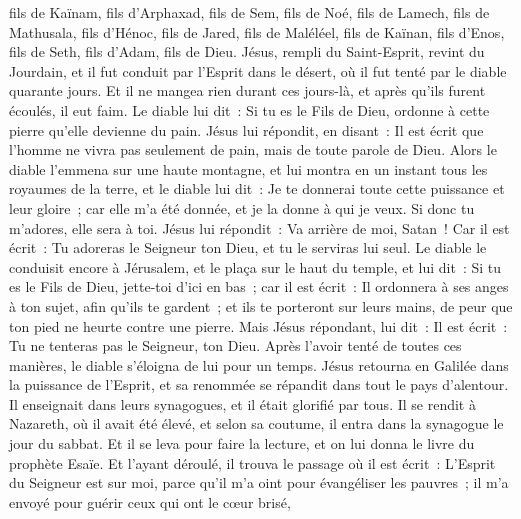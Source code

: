 \begin{multicols}{2}
fils de Kaïnam, fils d'Arphaxad, fils de Sem, fils de Noé, fils de Lamech,
fils de Mathusala, fils d'Hénoc, fils de Jared, fils de Maléléel, fils de Kaïnan,
fils d'Enos, fils de Seth, fils d'Adam, fils de Dieu.
\VerseOne{}Jésus, rempli du Saint-Esprit, revint du Jourdain, et il fut conduit par l'Esprit dans le désert,
où il fut tenté par le diable quarante jours. Et il ne mangea rien durant ces jours-là, et après qu'ils furent écoulés, il eut faim.
Le diable lui dit~: Si tu es le Fils de Dieu, ordonne à cette pierre qu'elle devienne du pain.
Jésus lui répondit, en disant~: Il est écrit que l'homme ne vivra pas seulement de pain, mais de toute parole de Dieu.
Alors le diable l'emmena sur une haute montagne, et lui montra en un instant tous les royaumes de la terre,
et le diable lui dit~: Je te donnerai toute cette puissance et leur gloire~; car elle m'a été donnée, et je la donne à qui je veux.
Si donc tu m'adores, elle sera à toi.
Jésus lui répondit~: Va arrière de moi, Satan~! Car il est écrit~: Tu adoreras le Seigneur ton Dieu, et tu le serviras lui seul.
Le diable le conduisit encore à Jérusalem, et le plaça sur le haut du temple, et lui dit~: Si tu es le Fils de Dieu, jette-toi d'ici en bas~;
car il est écrit~: Il ordonnera à ses anges à ton sujet, afin qu'ils te gardent~;
et ils te porteront sur leurs mains, de peur que ton pied ne heurte contre une pierre.
Mais Jésus répondant, lui dit~: Il est écrit~: Tu ne tenteras pas le Seigneur, ton Dieu.
Après l'avoir tenté de toutes ces manières, le diable s'éloigna de lui pour un temps.
Jésus retourna en Galilée dans la puissance de l'Esprit, et sa renommée se répandit dans tout le pays d'alentour.
Il enseignait dans leurs synagogues, et il était glorifié par tous.
Il se rendit à Nazareth, où il avait été élevé, et selon sa coutume, il entra dans la synagogue le jour du sabbat. Et il se leva pour faire la lecture,
et on lui donna le livre du prophète Esaïe. Et l'ayant déroulé, il trouva le passage où il est écrit~:
L'Esprit du Seigneur est sur moi, parce qu'il m'a oint pour évangéliser les pauvres~; il m'a envoyé pour guérir ceux qui ont le cœur brisé,

\end{multicols}
